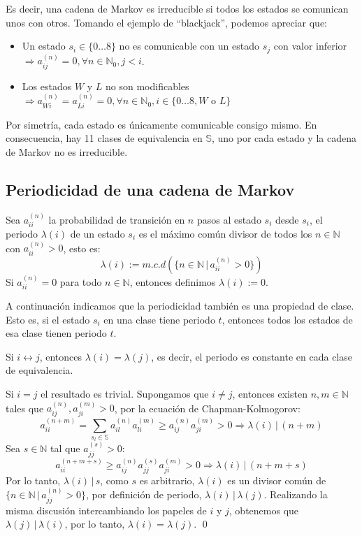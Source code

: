 Es decir, una cadena de Markov es irreducible si todos los estados se comunican unos con otros. Tomando el ejemplo de \enquote{blackjack}, podemos apreciar que:
    \begin{itemize}
        \item Un estado $s_i\in \{0\dots 8\}$ no es comunicable con un estado $s_j$ con valor inferior $\Longrightarrow a_{ij}^{(n)}=0, \forall n\in\mathbb{N}_0, j<i$.
        \item Los estados $W$ y $L$ no son modificables $\Longrightarrow a_{Wi}^{(n)}=a_{Li}^{(n)}=0, \forall n\in\mathbb{N}_0,  i \in \{0\dots 8, W$ o $L\}$
    \end{itemize}

Por simetría, cada estado es únicamente comunicable consigo mismo. En consecuencia, hay 11 clases de equivalencia en $\mathbb{S}$, uno por cada estado y la cadena de Markov no es irreducible.

\subsection{Periodicidad de una cadena de Markov}
\begin{definition}
Sea $a_{ii}^{(n)}$ la probabilidad de transición en $n$ pasos al estado $s_i$ desde $s_i$, el periodo $\lambda(i)$ de un estado $s_i$ es el máximo común divisor de todos los $n\in\mathbb{N}$ con $a_{ii}^{(n)}>0$, esto es:
\[
\lambda(i):=m.c.d(\{n\in\mathbb{N}\,|\, a_{ii}^{(n)}>0\})
\]
Si $a_{ii}^{(n)}=0$ para todo $n\in\mathbb{N}$, entonces definimos $\lambda(i):=0$.
\end{definition}
A continuación indicamos que la periodicidad también es una propiedad de clase. Esto es, si el estado $s_i$ en una clase tiene periodo $t$, entonces todos los estados de esa clase tienen periodo $t$.
\begin{theorem}
    Si $i\longleftrightarrow j$, entonces $\lambda(i)=\lambda(j)$, es decir, el periodo es constante en cada clase de equivalencia.
\end{theorem}
\begin{proofs*}
Si $i=j$ el resultado es trivial. Supongamos que $i\neq j$, entonces existen $n,m\in\mathbb{N}$ tales que $a_{ij}^{(n)},a_{ji}^{(m)}>0$, por la ecuación de Chapman-Kolmogorov:
\[ a_{ii}^{(n+m)}=\sum\limits_{s_l\in\mathbb{S}}a_{il}^{(n)}a_{li}^{(m)}\geq a_{ij}^{(n)}a_{ji}^{(m)}>0\Longrightarrow\lambda(i)\,|\,(n+m)\]
Sea $s\in\mathbb{N}$ tal que $a_{jj}^{(s)}>0$:
\[ a_{ii}^{(n+m+s)}\geq a_{ij}^{(n)}a_{jj}^{(s)}a_{ji}^{(m)}>0\Longrightarrow \lambda(i)\,|\,(n+m+s)\]
Por lo tanto, $\lambda(i)\,|\,s$, como $s$ es arbitrario, $\lambda(i)$ es un divisor común de $\{n\in\mathbb{N}\,|\, a_{jj}^{(n)}>0\}$, por definición de periodo, $\lambda(i)\,|\,\lambda(j)$. Realizando la misma discusión intercambiando los papeles de $i$ y $j$, obtenemos que $\lambda(j)\,|\,\lambda(i)$, por lo tanto, $\lambda(i)=\lambda(j)$. \qed
\end{proofs*}

